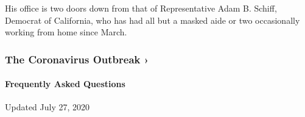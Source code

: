 His office is two doors down from that of Representative Adam B. Schiff,
Democrat of California, who has had all but a masked aide or two
occasionally working from home since March.

\href{https://www.nytimes.com/news-event/coronavirus?action=click\&pgtype=Article\&state=default\&region=MAIN_CONTENT_3\&context=storylines_faq}{}

\hypertarget{the-coronavirus-outbreak-}{%
\subsubsection{The Coronavirus Outbreak
›}\label{the-coronavirus-outbreak-}}

\hypertarget{frequently-asked-questions}{%
\paragraph{Frequently Asked
Questions}\label{frequently-asked-questions}}

Updated July 27, 2020

